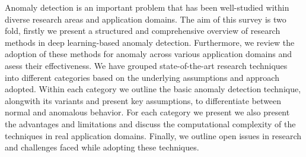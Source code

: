 Anomaly detection is an important problem that has been well-studied within diverse research areas and application domains. The aim of this survey is two fold, firstly we present a structured and comprehensive overview of research methods in deep learning-based anomaly detection. Furthermore, we review the adoption of these methods for anomaly across various application domains and asess their effectiveness. We have grouped state-of-the-art research techniques into different categories based on the underlying assumptions and approach adopted.  Within each category we outline the basic anomaly detection technique, alongwith its variants and present key assumptions, to differentiate between normal and anomalous behavior. For each category we present we also present the advantages and limitations and discuss the computational complexity of the techniques in real application domains. Finally, we outline open issues in research and challenges faced while adopting these techniques.

